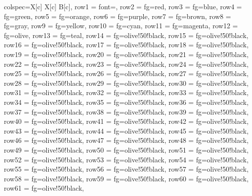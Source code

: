\documentclass{article}
\begin{document}
\begin{tblr}{colspec={X[c] X[c] B[c]},
             row{1} = {font=\bfseries},
             row{2} = {fg=red},
             row{3} = {fg=blue},
             row{4} = {fg=green},
             row{5} = {fg=orange},
             row{6} = {fg=purple},
             row{7} = {fg=brown},
             row{8} = {fg=gray},
             row{9} = {fg=yellow},
             row{10} = {fg=cyan},
             row{11} = {fg=magenta},
             row{12} = {fg=olive},
             row{13} = {fg=teal},
             row{14} = {fg=olive!50!black},
             row{15} = {fg=olive!50!black},
             row{16} = {fg=olive!50!black},
             row{17} = {fg=olive!50!black},
             row{18} = {fg=olive!50!black},
             row{19} = {fg=olive!50!black},
             row{20} = {fg=olive!50!black},
             row{21} = {fg=olive!50!black},
             row{22} = {fg=olive!50!black},
             row{23} = {fg=olive!50!black},
             row{24} = {fg=olive!50!black},
             row{25} = {fg=olive!50!black},
             row{26} = {fg=olive!50!black},
             row{27} = {fg=olive!50!black},
             row{28} = {fg=olive!50!black},
             row{29} = {fg=olive!50!black},
             row{30} = {fg=olive!50!black},
             row{31} = {fg=olive!50!black},
             row{32} = {fg=olive!50!black},
             row{33} = {fg=olive!50!black},
             row{34} = {fg=olive!50!black},
             row{35} = {fg=olive!50!black},
             row{36} = {fg=olive!50!black},
             row{37} = {fg=olive!50!black},
             row{38} = {fg=olive!50!black},
             row{39} = {fg=olive!50!black},
             row{40} = {fg=olive!50!black},
             row{41} = {fg=olive!50!black},
             row{42} = {fg=olive!50!black},
             row{43} = {fg=olive!50!black},
             row{44} = {fg=olive!50!black},
             row{45} = {fg=olive!50!black},
             row{46} = {fg=olive!50!black},
             row{47} = {fg=olive!50!black},
             row{48} = {fg=olive!50!black},
             row{49} = {fg=olive!50!black},
             row{50} = {fg=olive!50!black},
             row{51} = {fg=olive!50!black},
             row{52} = {fg=olive!50!black},
             row{53} = {fg=olive!50!black},
             row{54} = {fg=olive!50!black},
             row{55} = {fg=olive!50!black},
             row{56} = {fg=olive!50!black},
             row{57} = {fg=olive!50!black},
             row{58} = {fg=olive!50!black},
             row{59} = {fg=olive!50!black},
             row{60} = {fg=olive!50!black},
             row{61} = {fg=olive!50!black},
}
\end{tblr}
\end{document}
